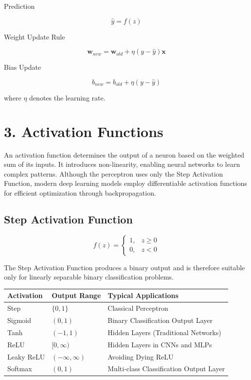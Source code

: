 \documentclass[11pt]{article}
\begin{document}
Prediction

\[
\hat y=f(z)
\]

Weight Update Rule

\[
\mathbf{w}_{new}
=
\mathbf{w}_{old}
+
\eta
(y-\hat y)
\mathbf{x}
\]

Bias Update

\[
b_{new}
=
b_{old}
+
\eta
(y-\hat y)
\]

where $\eta$ denotes the learning rate.


\section*{3. Activation Functions}

An activation function determines the output of a neuron based on the weighted sum of its inputs. It introduces non-linearity, enabling neural networks to learn complex patterns. Although the perceptron uses only the Step Activation Function, modern deep learning models employ differentiable activation functions for efficient optimization through backpropagation.

\subsection*{Step Activation Function}

\[
f(z)=
\begin{cases}
1,&z\ge0\\
0,&z<0
\end{cases}
\]

The Step Activation Function produces a binary output and is therefore suitable only for linearly separable binary classification problems.

\begin{center}
\begin{tabular}{|p{2.5cm}|p{3cm}|p{6cm}|}
\hline
\textbf{Activation} & \textbf{Output Range} & \textbf{Typical Applications}\\
\hline
Step & $\{0,1\}$ & Classical Perceptron\\
\hline
Sigmoid & $(0,1)$ & Binary Classification Output Layer\\
\hline
Tanh & $(-1,1)$ & Hidden Layers (Traditional Networks)\\
\hline
ReLU & $[0,\infty)$ & Hidden Layers in CNNs and MLPs\\
\hline
Leaky ReLU & $(-\infty,\infty)$ & Avoiding Dying ReLU\\
\hline
Softmax & $(0,1)$ & Multi-class Classification Output Layer\\
\hline
\end{tabular}
\end{center}
\end{document}
